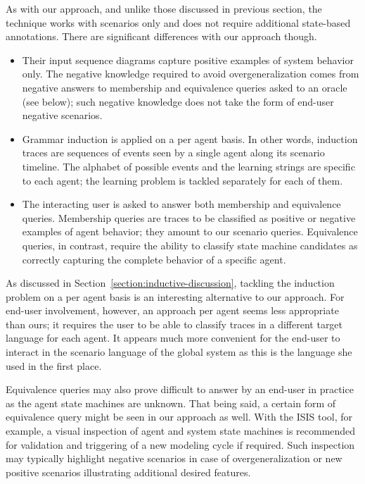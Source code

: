 As with our approach, and unlike those discussed in previous section, the technique works with scenarios only and does not require additional state-based annotations. There are significant differences with our approach though.
\begin{itemize}

\item Their input sequence diagrams capture positive examples of system behavior only. The negative knowledge required to avoid overgeneralization comes from negative answers to membership and equivalence queries asked to an oracle (see below); such negative knowledge does not take the form of end-user negative scenarios.

\item Grammar induction is applied on a per agent basis. In other words, induction traces are sequences of events seen by a single agent along its scenario timeline. The alphabet of possible events and the learning strings are specific to each agent; the learning problem is tackled separately for each of them.

\item The interacting user is asked to answer both membership and equivalence queries. Membership queries are traces to be classified as positive or negative examples of agent behavior; they amount to our scenario queries. Equivalence queries, in contrast, require the ability to classify state machine candidates as correctly capturing the complete behavior of a specific agent.
\end{itemize}

As discussed in Section~\ref{section:inductive-discussion}, tackling the induction problem on a per agent basis is an interesting alternative to our approach. For end-user involvement, however, an approach per agent seems less appropriate than ours; it requires the user to be able to classify traces in a different target language for each agent. It appears much more convenient for the end-user to interact in the scenario language of the global system as this is the language she used in the first place.

Equivalence queries may also prove difficult to answer by an end-user in practice as the agent state machines are unknown. That being said, a certain form of equivalence query might be seen in our approach as well. With the ISIS tool, for example, a visual inspection of agent and system state machines is recommended for validation and triggering of a new modeling cycle if required. Such inspection may typically highlight negative scenarios in case of overgeneralization or new positive scenarios illustrating additional desired features.

